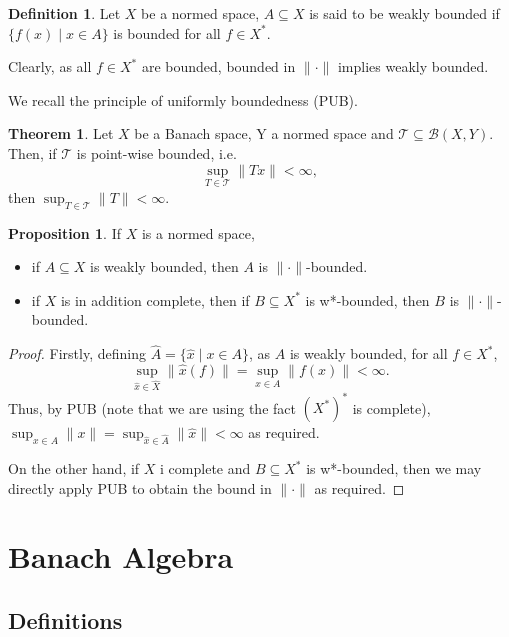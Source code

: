\documentclass[]{article}
\theoremstyle{definition}
\newtheorem{theorem}{Theorem}
\newtheorem{definition}{Definition}[section]
\newtheorem{proposition}{Proposition}[section]
\begin{document}
\begin{definition}
  Let \(X\) be a normed space, \(A \subseteq X\) is said to be weakly bounded if 
  \(\{f(x) \mid x \in A\}\) is bounded for all \(f \in X^*\).
\end{definition}

Clearly, as all \(f \in X^*\) are bounded, bounded in \(\|\cdot\|\) implies weakly bounded.

We recall the principle of uniformly boundedness (PUB).

\begin{theorem}
  Let \(X\) be a Banach space, Y a normed space and \(\mathcal{T} \subseteq \mathcal{B}(X, Y)\). 
  Then, if \(\mathcal{T}\) is point-wise bounded, i.e. 
  \[\sup_{T \in \mathcal{T}} \|Tx\| < \infty,\]
  then \(\sup_{T \in \mathcal{T}} \|T\| < \infty\).
\end{theorem}

\begin{proposition}
  If \(X\) is a normed space, 
  \begin{itemize}
    \item if \(A \subseteq X\) is weakly bounded, then \(A\) is \(\|\cdot\|\)-bounded.
    \item if \(X\) is in addition complete, then if \(B \subseteq X^*\) is w*-bounded, then 
      \(B\) is \(\|\cdot\|\)-bounded.
  \end{itemize}
\end{proposition}
\begin{proof}
  Firstly, defining \(\hat A = \{\hat x \mid x \in A\}\), as \(A\) is weakly bounded, for all 
  \(f \in X^*\), 
  \[\sup_{\hat x \in \hat X}\|\hat x(f)\| = \sup_{x \in A} \|f(x)\| < \infty.\]
  Thus, by PUB (note that we are using the fact \((X^*)^*\) is complete), 
  \(\sup_{x \in A} \|x\| = \sup_{\hat x \in \hat A} \|\hat x\| < \infty\) 
  as required. 
  
  On the other hand, if \(X\) i complete and \(B \subseteq X^*\) is w*-bounded, then 
  we may directly apply PUB to obtain the bound in \(\|\cdot\|\) as required.
\end{proof}

\newpage
\section{Banach Algebra}

\subsection{Definitions}
\end{document}
